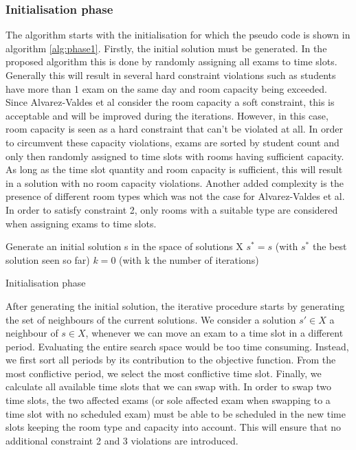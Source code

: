 \subsubsection{Initialisation phase}
The algorithm starts with the initialisation for which the pseudo code is shown in algorithm \ref{alg:phase1}. Firstly, the initial solution must be generated. In the proposed algorithm this is done by randomly assigning all exams to time slots. Generally this will result in several hard constraint violations such as students have more than 1 exam on the same day and room capacity being exceeded. Since Alvarez-Valdes et al consider the room capacity a soft constraint, this is acceptable and will be improved during the iterations. However, in this case, room capacity is seen as a hard constraint that can't be violated at all. In order to circumvent these capacity violations, exams are sorted by student count and only then randomly assigned to time slots with rooms having sufficient capacity. As long as the time slot quantity and room capacity is sufficient, this will result in a solution with no room capacity violations. Another added complexity is the presence of different room types which was not the case for Alvarez-Valdes et al. In order to satisfy constraint 2, only rooms with a suitable type are considered when assigning exams to time slots.

\begin{algorithm}
 Generate an initial solution s in the space of solutions X\;
 $s^* = s$ (with $s^*$ the best solution seen so far)\;
 $k = 0$ (with k the number of iterations)\;

\caption{Initialisation phase}
\label{alg:phase1}
\end{algorithm}

After generating the initial solution, the iterative procedure starts by generating the set of neighbours of the current solutions. We consider a solution $s' \in X$ a neighbour of $s \in X$, whenever we can move an exam to a time slot in a different period. Evaluating the entire search space would be too time consuming. Instead, we first sort all periods by its contribution to the objective function. From the most conflictive period, we select the most conflictive time slot. Finally, we calculate all available time slots that we can swap with. In order to swap two time slots, the two affected exams (or sole affected exam when swapping to a time slot with no scheduled exam) must be able to be scheduled in the new time slots keeping the room type and capacity into account. This will ensure that no additional constraint 2 and 3 violations are introduced.

